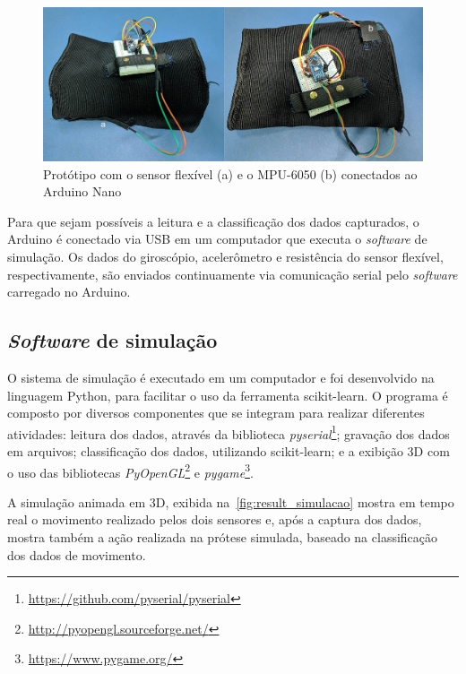\begin{figure}[ht]
	\caption{\label{fig:result_prototipo}Protótipo com o sensor flexível (a) e o MPU-6050 (b) conectados ao Arduino Nano}
	\begin{center}
	    \includegraphics[width=.8\textwidth]{resources/result_prototipo}
	\end{center}
\end{figure}

Para que sejam possíveis a leitura e a classificação dos dados capturados, o Arduino é conectado via USB em um computador que executa o \textit{software} de simulação. Os dados do giroscópio, acelerômetro e resistência do sensor flexível, respectivamente, são enviados continuamente via comunicação serial pelo \textit{software} carregado no Arduino.

\subsection{\textit{Software} de simulação}\label{sec:result_simulacao}
O sistema de simulação é executado em um computador e foi desenvolvido na linguagem Python, para facilitar o uso da ferramenta scikit-learn. O programa é composto por diversos componentes que se integram para realizar diferentes atividades: leitura dos dados, através da biblioteca \textit{pyserial}\footnote{\url{https://github.com/pyserial/pyserial}}; gravação dos dados em arquivos; classificação dos dados, utilizando scikit-learn; e a exibição 3D com o uso das bibliotecas \textit{PyOpenGL}\footnote{\url{http://pyopengl.sourceforge.net/}} e \textit{pygame}\footnote{\url{https://www.pygame.org/}}.

A simulação animada em 3D, exibida na~\autoref{fig:result_simulacao} mostra em tempo real o movimento realizado pelos dois sensores e, após a captura dos dados, mostra também a ação realizada na prótese simulada, baseado na classificação dos dados de movimento.

